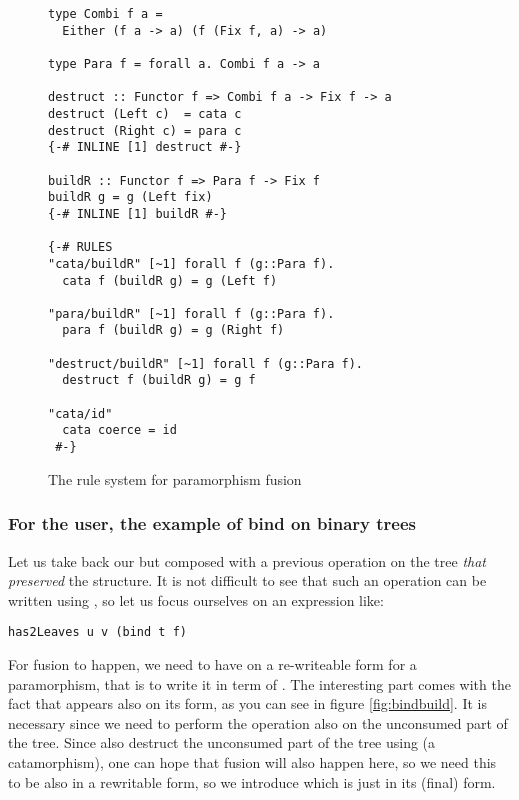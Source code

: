 \begin{figure}
\begin{verbatim}
type Combi f a =
  Either (f a -> a) (f (Fix f, a) -> a)

type Para f = forall a. Combi f a -> a

destruct :: Functor f => Combi f a -> Fix f -> a
destruct (Left c)  = cata c
destruct (Right c) = para c
{-# INLINE [1] destruct #-}

buildR :: Functor f => Para f -> Fix f
buildR g = g (Left fix)
{-# INLINE [1] buildR #-}

{-# RULES
"cata/buildR" [~1] forall f (g::Para f).
  cata f (buildR g) = g (Left f)

"para/buildR" [~1] forall f (g::Para f).
  para f (buildR g) = g (Right f)

"destruct/buildR" [~1] forall f (g::Para f).
  destruct f (buildR g) = g f

"cata/id"
  cata coerce = id
 #-}
\end{verbatim}
\caption{The rule system for paramorphism fusion}
\label{fig:para}
\end{figure}

\subsubsection{For the user, the example of bind on binary trees}
Let us take back our   but composed with a previous operation on the tree \emph{that preserved} the structure. It is not difficult to see that such an operation can be written using , so let us focus ourselves on an expression like:

\begin{verbatim}
has2Leaves u v (bind t f)
\end{verbatim}

\noindent For fusion to happen, we need to have  on a re-writeable form for a paramorphism, that is to write it in term of . The interesting part comes with the fact that  appears also on its  form, as you can see in figure \ref{fig:bindbuild}. It is necessary since we need to perform the  operation also on the unconsumed part of the tree. Since  also destruct the unconsumed part of the tree using  (a catamorphism), one can hope that fusion will also happen here, so we need this  to be also in a rewritable form, so we introduce  which is just  in its (final)  form.

